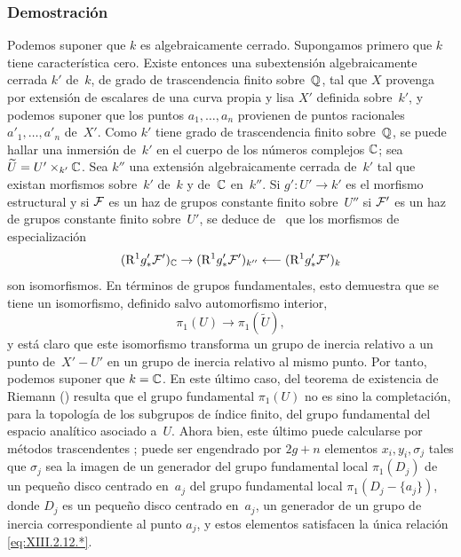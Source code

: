 \subsubsection*{Demostración}
Podemos suponer que $k$ es algebraicamente cerrado. Supongamos primero que
$k$ tiene característica cero. Existe entonces una subextensión
algebraicamente cerrada $k'$ de~$k$, de grado de trascendencia finito
sobre~$\QQ$, tal que $X$ provenga por extensión de escalares de una curva
propia y lisa $X'$ definida sobre~$k'$, y podemos suponer que los puntos
$a_1,\dots,a_n$ provienen de puntos racionales $a'_1,\dots,a'_n$ de~$X'$.
Como $k'$ tiene grado de trascendencia finito sobre~$\QQ$, se puede hallar
una inmersión de~$k'$ en el cuerpo de los números complejos $\CC$; sea
$\widetilde{U}=U'\times_{k'}\CC$. Sea $k''$ una extensión algebraicamente
cerrada de~$k'$ tal que existan morfismos sobre~$k'$ de~$k$ y de~$\CC$
en~$k''$. Si $g'\colon U'\to k'$ es el morfismo estructural y
{si $\cal F$ es un haz de grupos constante finito sobre~$U''$}
{si $\cal F'$ es un haz de grupos constante finito sobre~$U'$},
se deduce de~ que los morfismos de especialización
$$
(\R^1g'_*\cal{F}')_{\CC}\to(\R^1g'_*\cal{F}')_{k''}
\from(\R^1g'_*\cal{F}')_k
$$
son isomorfismos. En términos de grupos fundamentales, esto demuestra que
se tiene un isomorfismo, definido salvo automorfismo interior,
$$
\pi_1(U)\to\pi_1(\widetilde{U}),
$$
y está claro que este isomorfismo transforma un grupo de inercia relativo
a un punto de~$X'-U'$ en un grupo de inercia relativo al mismo punto.
Por tanto, podemos suponer que $k=\CC$. En este último caso, del teorema
de existencia de Riemann () resulta que el grupo fundamental
$\pi_1(U)$ no es sino la completación, para la topología de los subgrupos
de índice finito, del grupo fundamental del espacio analítico asociado
a~$U$. Ahora bien, este último puede calcularse por métodos trascendentes
\cite[ch
\S 47]{XIII.3};
%
puede ser engendrado por $2g+n$ elementos $x_i,y_i,\sigma_j$ tales que
$\sigma_j$ sea la imagen de un generador
{del grupo fundamental local $\pi_1(D_j)$ de un pequeño disco centrado
en~$a_j$}
{del grupo fundamental local $\pi_1(D_j-\{a_j\})$, donde $D_j$ es un
pequeño disco centrado en~$a_j$},
\ie un generador de un grupo de inercia correspondiente al punto $a_j$,
y estos elementos satisfacen la única relación \eqref{eq:XIII.2.12.*}.

